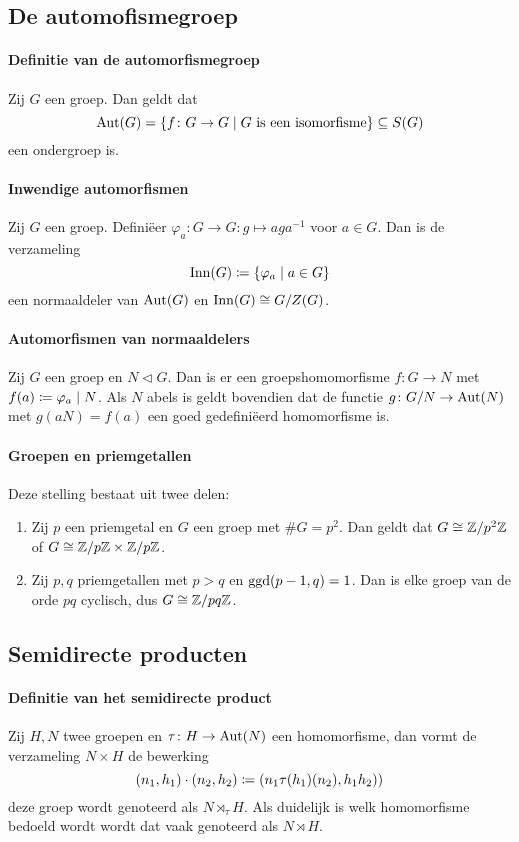 \subsection{De automofismegroep}
\paragraph{Definitie van de automorfismegroep} Zij \(G\) een groep. Dan geldt dat
\[
    \operatorname{Aut}(G)=\{f\colon G\to G\mid\text{\(G\) is een isomorfisme}\}\subseteq S(G)
\]
een ondergroep is.

\paragraph{Inwendige automorfismen} Zij \(G\) een groep. Definiëer \(\varphi_{a}\colon G\to G\colon g\mapsto aga^{-1}\) voor \(a\in G\). Dan is de verzameling
\[
    \operatorname{Inn}(G)\coloneqq\{\varphi_{a}\mid a\in G\}
\]
een normaaldeler van \(\operatorname{Aut}(G)\) en \(\operatorname{Inn}(G)\cong G/Z(G)\).

\paragraph{Automorfismen van normaaldelers} Zij \(G\) een groep en \(N\triangleleft G\). Dan is er een groepshomomorfisme \(f\colon G\to N\) met \(f(a)\coloneqq\varphi_{a}\mid N\). Als \(N\) abels is geldt bovendien dat de functie \(g\colon G/N\to\operatorname{Aut}(N)\) met \(g(aN)=f(a)\) een goed gedefiniëerd homomorfisme is.

\paragraph{Groepen en priemgetallen} Deze stelling bestaat uit twee delen:
\begin{enumerate}
    \item Zij \(p\) een priemgetal en \(G\) een groep met \(\#G=p^{2}\). Dan geldt dat \(G\cong\mathbb{Z}/p^{2}\mathbb{Z}\) of \(G\cong\mathbb{Z}/p\mathbb{Z}\times\mathbb{Z}/p\mathbb{Z}\).
    \item Zij \(p,q\) priemgetallen met \(p>q\) en \(\operatorname{ggd}(p-1,q)=1\). Dan is elke groep van de orde \(pq\) cyclisch, dus \(G\cong\mathbb{Z}/pq\mathbb{Z}\).
\end{enumerate}

\subsection{Semidirecte producten}
\paragraph{Definitie van het semidirecte product} Zij \(H,N\) twee groepen en \(\tau\colon H\to\operatorname{Aut}(N)\) een homomorfisme, dan vormt de verzameling \(N\times H\) de bewerking
\[
    (n_{1},h_{1})\cdot(n_{2},h_{2})\coloneqq(n_{1}\tau(h_{1})(n_{2}),h_{1}h_{2}))
\]
deze groep wordt genoteerd als \(N\rtimes_{\tau}H\). Als duidelijk is welk homomorfisme bedoeld wordt wordt dat vaak genoteerd als \(N\rtimes H\).

